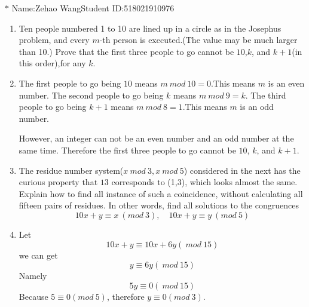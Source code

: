 \documentclass[12pt,a4paper]{article}
\makeatletter
\newtheorem*{solution}{Solution}
\theoremstyle{definition}
\renewenvironment{solution}[1][Solution] {\par\pushQED{\qed}\normalfont\topsep6\p@\@plus6\p@\relax\trivlist\item[\hskip\labelsep\bfseries#1\@addpunct{.}]\ignorespaces}{\popQED\endtrivlist\@endpefalse} \makeatother
\makeatother
\begin{document}
\noindent

\noindent{}
\begin{center}
\footnotesize{\color{blue}$*$ Name:Zehao Wang\quad Student ID:518021910976}
\end{center}

\begin{enumerate}
	\item 
	    Ten people numbered 1 to 10 are lined up in a circle as in the Josephus problem, and every $m$-th person is executed.(The value may be much larger than 10.) Prove that the first three people to go cannot be $10$,$k$, and $k+1$(in this order),for any $k$.
	    \begin{solution}
	    	The first people to go being $10$ means $m\ mod\ 10=0$.This means $m$ is an even number.
	    	The second people to go being $k$ means $m\ mod\ 9=k$.
	    	The third people to go being $k+1$ means $m\ mod\ 8=1$.This means $m$ is an odd number.
	    	
	        However, an integer can not be an even number and an odd number at the same time.
	        Therefore the first three people to go cannot be $10$, $k$, and $k+1$.
	    \end{solution}
	\item 
	    The residue number system($x\ mod\ 3,x\ mod\ 5$) considered in the next has the curious property that $13$ corresponds to (1,3), which looks almost the same. Explain how to find all instance of such a coincidence, without calculating all fifteen pairs of residues. In other words, find all solutions to the congruences
	    \begin{equation*}
	        10x+y\equiv x\ (mod\ 3),\quad 10x+y\equiv y\ (mod\ 5)
	    \end{equation*}
	    \begin{solution}
	    	Let
	    	\begin{equation*}
	    	    10x+y\equiv 10x+6y(\ mod\ 15)
	    	\end{equation*}
	    	we can get
	    	\begin{equation*}
	    	    y\equiv 6y(\ mod\ 15)
	    	\end{equation*}
	    	Namely
	    	\begin{equation*}
	    	    5y\equiv 0(\ mod\ 15)
	    	\end{equation*}
	    	Because $5\equiv 0(mod\ 5)$, therefore $y\equiv0(mod\ 3)$.
	    	

\end{solution}
\end{enumerate}
\end{document}
